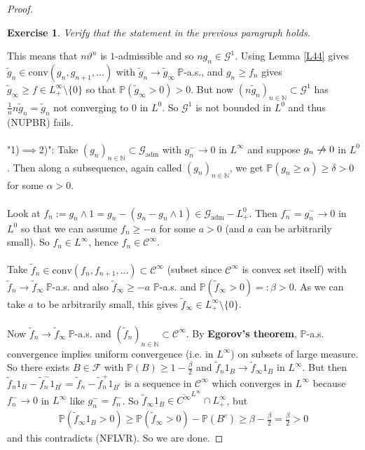 \documentclass[12pt,a4paper, twoside]{article}
\newtheorem{exe}{Exercise}[section]
\theoremstyle{definition}
\newcommand{\PP}{\mathbb{P}} %
\begin{document}
\begin{proof}
\begin{exe} \label{ex14} Verify that the statement in the previous paragraph holds.
\end{exe}
\noindent This means that $n \vartheta^n$ is $1$-admissible and so $n g_n \in \mathcal{G}^1$. Using Lemma \ref{L44} gives $\widetilde{g}_n \in \text{conv}(g_n, g_{n+1}, \dots )$ with $\widetilde{g}_n \to \widetilde{g}_\infty \ \PP$-a.s., and $g_n \geq f_n$ gives $\widetilde{g}_\infty \geq f \in L_+^\infty \setminus \{0\}$ so that $\PP( \widetilde{g}_\infty > 0)>0$. But now $(n \widetilde{g}_n)_{n \in \mathbb{N}} \subset \mathcal{G}^1$ has $\frac{1}{n}n \widetilde{g}_n = \widetilde{g}_n$ not converging to $0$ in $L^0$. So $\mathcal{G}^1$ is not bounded in $L^0$ and thus (NUPBR) fails. 
\\\\
"1)$\implies$2)": Take $(g_n)_{n \in \mathbb{N}} \subset \mathcal{G}_\text{adm}$ with $g_n^- \to 0$ in $L^\infty$ and suppose $g_n \centernot\to 0$ in $L^0$. Then along a subsequence, again called $(g_n)_{n \in \mathbb{N}}$, we get $\PP( g_n \geq \alpha) \geq \delta >0$ for some $\alpha >0$. \\\\
Look at $f_n:= g_n \wedge 1 = g_n-(g_n-g_n \wedge 1) \in \mathcal{G}_\text{adm}-L_+^0$. Then $f_n^- = g_n^- \to 0$ in $L^0$ so that we can assume $f_n \geq - a$ for some $a >0$ (and $a$ can be arbitrarily small). So $f_n \in L^\infty$, hence $f_n \in \mathcal{C}^\infty$. \\
\\
Take $\widetilde{f}_n \in \text{conv}(f_n, f_{n+1}, \dots ) \subset \mathcal{C}^\infty$ (subset since $\mathcal{C}^\infty$ is convex set itself) with $\widetilde{f}_n \to \widetilde{f}_\infty \ \PP$-a.s. and also $\widetilde{f}_\infty \geq -a $ $\PP$-a.s. and $\PP( \widetilde{f}_\infty >0)=: \beta >0$. As we can take $a$ to be arbitrarily small, this gives $\widetilde{f}_\infty \in L_+^\infty \setminus \{0\}$. \\
\\
Now $\widetilde{f}_n \to \widetilde{f}_\infty \ \PP$-a.s. and $(\widetilde{f}_n)_{n \in \mathbb{N}} \subset \mathcal{C}^\infty$. By \textbf{Egorov's theorem}, $\PP$-a.s. convergence implies uniform convergence (i.e. in $L^\infty$) on subsets of large measure. So there exists $B \in \mathcal{F}$ with $\PP(B) \geq 1- \frac{\beta}{2}$ and $\widetilde{f}_n 1_B \to \widetilde{f}_\infty 1_B$ in $L^\infty$. But then $\widetilde{f}_n 1_B - \widetilde{f}_n^- 1_{B^c}= \widetilde{f}_n-\widetilde{f}_n^+ 1_{B^c}$ is a sequence in $\mathcal{C}^\infty$ which converges in $L^\infty$ because $f_n^- \to 0$ in $L^\infty$ like $g_n^-=f_n^-$.  So $\widetilde{f}_\infty 1_B \in \overline{C^\infty}^{L^\infty} \cap L_+^\infty$, but 
\begin{align*}
\PP( \widetilde{f}_\infty 1_B > 0) \geq \PP( \widetilde{f}_\infty >0)- \PP(B^c) \geq \beta - \frac{\beta}{2}= \frac{\beta}{2} >0
\end{align*}
and this contradicts (NFLVR). So we are done. 
\end{proof}
\end{document}
